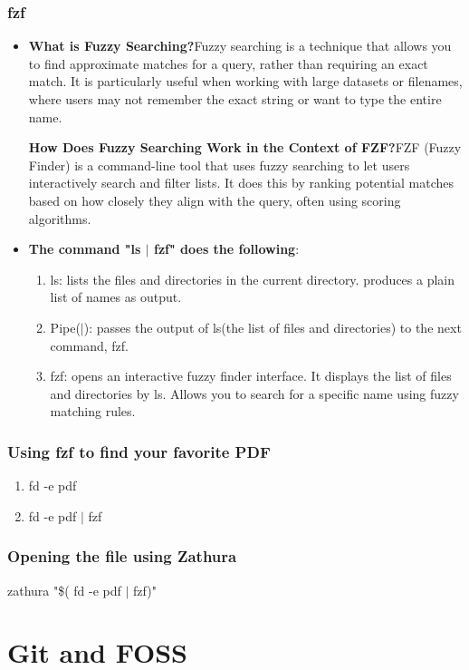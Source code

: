 \documentclass[12pt, letterpaper]{article}
\begin{document}
\begin{enumerate}
\subsubsection{fzf}
\begin{itemize}
    \item \textbf{What is Fuzzy Searching?}Fuzzy searching is a technique that allows you to find approximate matches for a query, rather than requiring an exact match. It is particularly useful when working with large datasets or filenames, where users may not remember the exact string or want to type the entire name.
    
    \textbf{How Does Fuzzy Searching Work in the Context of FZF?}FZF (Fuzzy Finder) is a command-line tool that uses fuzzy searching to let users interactively search and filter lists. It does this by ranking potential matches based on how closely they align with the query, often using scoring algorithms.
    \item \textbf{The command "ls $|$ fzf" does the following}:
    \begin{enumerate}
        \item ls: lists the files and directories in the current directory. produces a plain list of names as output.

        \item Pipe($|$): passes the output of ls(the list of files and directories) to the next command, fzf.

        \item fzf: opens an interactive fuzzy finder interface. It displays the list of files and directories by ls. Allows you to search for a specific name using fuzzy matching rules.
    \end{enumerate}
    \end{itemize}
\subsubsection{Using fzf to find your favorite PDF}
\begin{enumerate}
    \item fd -e pdf
    \item fd -e pdf $|$ fzf
\end{enumerate}
\subsubsection{Opening the file using Zathura}
zathura "\$( fd -e pdf $|$ fzf)"
\section{Git and FOSS}

\end{enumerate}
\end{document}
